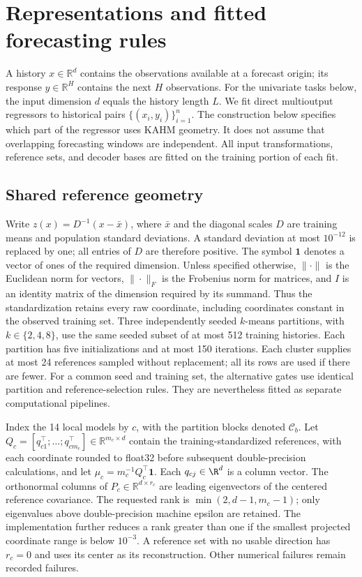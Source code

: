 \section{Representations and fitted forecasting rules}
\label{sec:nf-methods}

A history $x\in\mathbb R^d$ contains the observations available at a forecast
origin; its response $y\in\mathbb R^H$ contains the next $H$ observations.
For the univariate tasks below, the input dimension $d$ equals the history length $L$.
We fit direct multioutput regressors to historical pairs
$\{(x_i,y_i)\}_{i=1}^n$.  The construction below specifies which part of the
regressor uses KAHM geometry.  It does not assume that overlapping forecasting
windows are independent.  All input transformations, reference sets, and
decoder bases are fitted on the training portion of each fit.

\subsection{Shared reference geometry}
\label{sec:nf-reference-geometry}

Write $z(x)=D^{-1}(x-\bar x)$, where $\bar x$ and the diagonal scales $D$ are
training means and population standard deviations.  A standard deviation at
most $10^{-12}$ is replaced by one; all entries of $D$ are therefore positive. The symbol $\mathbf1$
denotes a vector of ones of the required dimension. Unless specified
otherwise, $\|\cdot\|$ is the Euclidean norm for vectors,
$\|\cdot\|_F$ is the Frobenius norm for matrices, and $I$ is an
identity matrix of the dimension required by its summand. Thus the
standardization retains every
raw coordinate, including coordinates constant in the observed training set.
Three independently seeded $k$-means partitions, with $k\in\{2,4,8\}$, use
the same seeded subset of at most 512 training histories.  Each partition has
five initializations and at most 150 iterations.  Each cluster supplies at
most 24 references sampled without replacement; all its rows are used if
there are fewer.  For a common seed and training set, the alternative gates
use identical partition and reference-selection rules.  They are nevertheless
fitted as separate computational pipelines.

Index the 14 local models by $c$, with the partition blocks denoted
$\mathcal C_b$.  Let
$Q_c=[q_{c1}^\top;\ldots;q_{cm_c}^\top]\in\mathbb R^{m_c\times d}$ contain the
training-standardized references, with each coordinate rounded to float32
before subsequent double-precision calculations, and let $\mu_c=m_c^{-1}Q_c^\top\mathbf 1$.
Each $q_{cj}\in\R^d$ is a column vector. The orthonormal columns of $P_c\in\mathbb R^{d\times r_c}$ are leading
eigenvectors of the centered reference covariance.  The requested rank is
$\min(2,d-1,m_c-1)$; only eigenvalues above double-precision machine epsilon
are retained.  The implementation further reduces a rank greater
than one if the smallest projected coordinate range is below $10^{-3}$.
A reference set with no usable direction has $r_c=0$ and uses its center as
its reconstruction.  Other numerical failures remain recorded failures.

